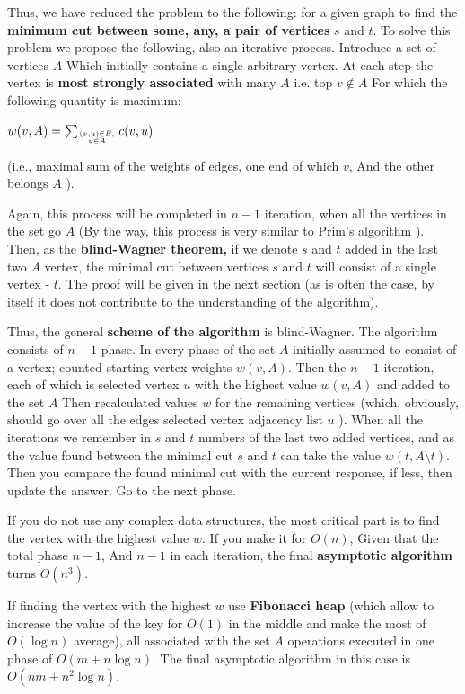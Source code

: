 Thus, we have reduced the problem to the following: for a given graph to find the \textbf{minimum cut between some, any, a pair of vertices} $s$ and $t$. To solve this problem we propose the following, also an iterative process. Introduce a set of vertices $A$ Which initially contains a single arbitrary vertex. At each step the vertex is \textbf{most strongly associated} with many $A$ i.e. top $v \not \in A$ For which the following quantity is maximum:

$w(v,A)=\sum_{{(v,u)\in E,\atop u\in A}}c(v,u)$

(i.e., maximal sum of the weights of edges, one end of which $v$, And the other belongs $A$ ).

Again, this process will be completed in $n-1$ iteration, when all the vertices in the set go $A$ (By the way, this process is very similar to Prim's algorithm ). Then, as the \textbf{blind-Wagner theorem,} if we denote $s$ and $t$ added in the last two $A$ vertex, the minimal cut between vertices $s$ and $t$ will consist of a single vertex - $t$. The proof will be given in the next section (as is often the case, by itself it does not contribute to the understanding of the algorithm).

Thus, the general \textbf{scheme of the algorithm} is blind-Wagner. The algorithm consists of $n-1$ phase. In every phase of the set $A$ initially assumed to consist of a vertex; counted starting vertex weights $w (v, A)$. Then the $n-1$ iteration, each of which is selected vertex $u$ with the highest value $w (v, A)$ and added to the set $A$ Then recalculated values $w$ for the remaining vertices (which, obviously, should go over all the edges selected vertex adjacency list $u$ ). When all the iterations we remember in $s$ and $t$ numbers of the last two added vertices, and as the value found between the minimal cut $s$ and $t$ can take the value $w (t, A \setminus t)$. Then you compare the found minimal cut with the current response, if less, then update the answer. Go to the next phase.

If you do not use any complex data structures, the most critical part is to find the vertex with the highest value $w$. If you make it for $O (n)$, Given that the total phase $n-1$, And $n-1$ in each iteration, the final \textbf{asymptotic algorithm} turns $O (n ^ 3)$.

If finding the vertex with the highest $w$ use \textbf{Fibonacci heap} (which allow to increase the value of the key for $O (1)$ in the middle and make the most of $O (\log n)$ average), all associated with the set $A$ operations executed in one phase of $O (m + n \log n)$. The final asymptotic algorithm in this case is $O (n m + n ^ 2 \log n)$.

